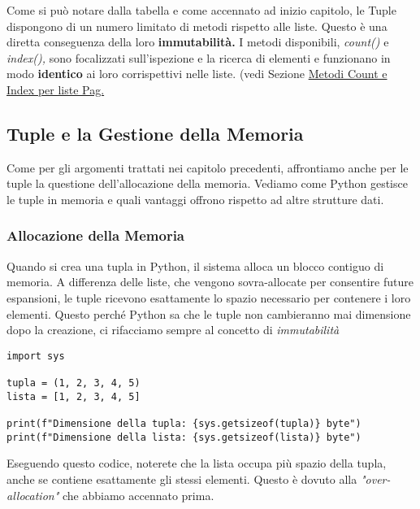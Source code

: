 Come si può notare dalla tabella e come accennato ad inizio capitolo, le Tuple dispongono di un numero limitato di metodi rispetto alle liste. Questo è una diretta conseguenza della loro \textbf{immutabilità.} I metodi disponibili, \textit{count()} e \textit{index(),} sono focalizzati sull'ispezione e la ricerca di elementi e funzionano in modo \textbf{identico} ai loro corrispettivi nelle liste. (vedi Sezione \hyperref[EsempiInputCountListe]{Metodi Count e Index per liste Pag.\pageref{EsempiInputCountListe}}


\newpage



\subsection{Tuple e la Gestione della Memoria}\label{GestioneMemoriaTuple}

Come per gli argomenti trattati nei capitolo precedenti, affrontiamo anche per le tuple la questione dell'allocazione della memoria. Vediamo come Python gestisce le tuple in memoria e quali vantaggi offrono rispetto ad altre strutture dati.


\subsubsection{Allocazione della Memoria}
Quando si crea una tupla in Python, il sistema alloca un blocco contiguo di memoria. A differenza delle liste, che vengono sovra-allocate per consentire future espansioni, le tuple ricevono esattamente lo spazio necessario per contenere i loro elementi. Questo perché Python sa che le tuple non cambieranno mai dimensione dopo la creazione, ci rifacciamo sempre al concetto di \textit{immutabilità}

\begin{lstlisting}
import sys

tupla = (1, 2, 3, 4, 5)
lista = [1, 2, 3, 4, 5]

print(f"Dimensione della tupla: {sys.getsizeof(tupla)} byte")
print(f"Dimensione della lista: {sys.getsizeof(lista)} byte")
\end{lstlisting}




Eseguendo questo codice, noterete che la lista occupa più spazio della tupla, anche se contiene esattamente gli stessi elementi. Questo è dovuto alla \textit{"over-allocation"} che abbiamo accennato prima.



